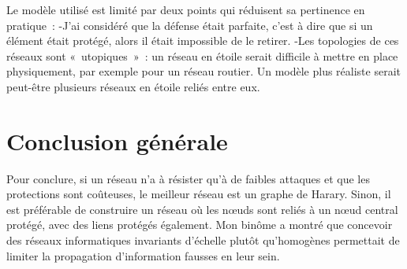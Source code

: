 \documentclass[12pt,a4paper]{article}
\begin{document}
Le modèle utilisé est limité par deux points qui réduisent sa pertinence en pratique :
	-J'ai considéré que la défense était parfaite, c'est à dire que si un élément était protégé, alors il était impossible de le retirer.
	-Les topologies de ces réseaux sont « utopiques » : un réseau en étoile serait difficile à mettre en place physiquement, par exemple pour un réseau routier. Un modèle plus réaliste serait peut-être plusieurs réseaux en étoile reliés entre eux.
	
\section{Conclusion générale}
Pour conclure, si un réseau n'a à résister qu'à de faibles attaques et que les protections sont coûteuses,  le meilleur réseau est un graphe de Harary. Sinon, il est préférable de construire un réseau où les nœuds sont reliés à un nœud central protégé, avec des liens protégés également. Mon binôme a montré que concevoir des réseaux informatiques invariants d'échelle plutôt qu'homogènes permettait de limiter la propagation d'information fausses en leur sein.
\end{document}
